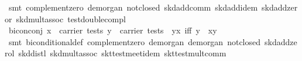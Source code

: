 \begin{isabellebody}
\ {}smt\ complement{}zero\ de{}morgan{}\ not{}closed\ skd{}add{}comm\ skd{}add{}idem\ skd{}add{}zeror\ skd{}mult{}assoc\ test{}double{}compl{}%
\endisatagproof
{\isafoldproof}%
%
\isadelimproof
\isanewline
%
\endisadelimproof
\isanewline
{}\isamarkupfalse%
\ bicon{}conj{}{}\ {}{}x\ {}\ carrier\ tests{}\ y\ {}\ carrier\ tests{}\ {}\ y{}{}x\ iff\ y{}\ {}\ x{}y{}\isanewline
%
\isadelimproof
\ \ %
\endisadelimproof
%
\isatagproof
{}\isamarkupfalse%
\ {}smt\ biconditional{}def\ complement{}zero\ de{}morgan{}\ de{}morgan{}\ not{}closed\ skd{}add{}zerol\ skd{}distl\ skd{}mult{}assoc\ skt{}test{}meet{}idem\ skt{}test{}mult{}comm{}%
\endisatagproof
{\isafoldproof}%
%
\isadelimproof
\isanewline
%
\endisadelimproof
\isanewline
{}\isamarkupfalse%

\end{isabellebody}
